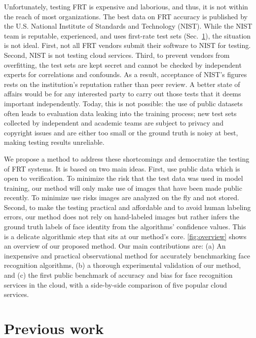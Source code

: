 \documentclass[10pt,twocolumn,letterpaper]{article}
\begin{document}
Unfortunately, testing FRT is expensive and laborious, and thus, it is not within the reach of most organizations. The best data on FRT accuracy is published by the U.S. National Institute of Standards and Technology (NIST). While the NIST team is reputable, experienced, and uses first-rate test sets (Sec.~\ref{sec:previous-work}), the situation is not ideal. First, not all FRT vendors submit their software to NIST for testing. Second, NIST is not testing cloud services. Third, to prevent vendors from overfitting, the test sets are kept secret and cannot be checked by independent experts for correlations and confounds. As a result, acceptance of NIST's figures rests on the institution's reputation rather than peer review.
%
A better state of affairs would be for any interested party to carry out those tests that it deems important independently. Today, this is not possible: the use of public datasets often leads to evaluation data leaking into the training process; new test sets collected by independent and academic teams are subject to privacy and copyright issues and are either too small or the ground truth is noisy at best, making testing results unreliable.

We propose a method to address these shortcomings and democratize the testing of FRT systems. It is based on two main ideas. First, use public data which is open to verification. To minimize the risk that the test data was used in model training, our method will only make use of images that have been made public recently. 
To minimize use risks images are analyzed on the fly and not stored.
Second, to make the testing practical and affordable and to avoid human labeling errors, our method does not rely on hand-labeled images but rather infers the ground truth labels of face identity from the algorithms' confidence values. This is a delicate algorithmic step that sits at our method's core.  
\cref{fig:overview} shows an overview of our proposed method.
%
Our main contributions are: (a) An inexpensive and practical observational method for accurately benchmarking face recognition algorithms, (b) a thorough experimental validation of our method, and (c) the first public benchmark of accuracy and bias for face recognition services in the cloud, with a side-by-side comparison of five popular cloud services.

\section{Previous work}
\label{sec:previous-work}
\end{document}
